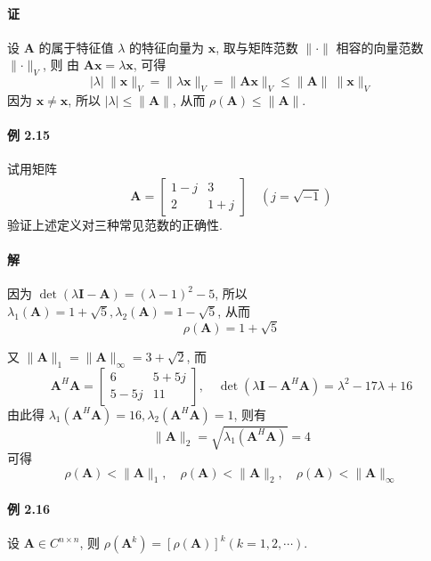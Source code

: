 \paragraph*{证} 设 $\bm{A}$ 的属于特征值 $\lambda$ 的特征向量为 $\bm{x}$, 取与矩阵范数 $\lVert \bm{\cdot} \rVert$ 相容的向量范数 $\lVert \bm{\cdot} \rVert _V$, 则
由 $\bm{Ax} = \lambda\bm{x}$, 可得
$$
    \lvert \lambda \rvert \ \lVert \bm{x} \rVert _V = \lVert \lambda\bm{x} \rVert _V = \lVert \bm{Ax} \rVert _V \leqslant \lVert \bm{A} \rVert \ \lVert \bm{x} \rVert _V
$$
因为 $\bm{x} \neq \bm{x}$, 所以 $\lvert \lambda \rvert \leqslant \lVert \bm{A} \rVert$, 从而 $\rho(\bm{A}) \leqslant \lVert \bm{A} \rVert$.

\paragraph*{例 2.15} 试用矩阵
$$
    \bm{A} = \begin{bmatrix}
        1 - j & 3     \\
        2     & 1 + j
    \end{bmatrix} \quad (j = \sqrt{-1})
$$
验证上述定义对三种常见范数的正确性.

\paragraph*{解} 因为 $\det(\lambda\bm{I} - \bm{A}) = (\lambda - 1)^2 - 5$, 所以 $\lambda_1(\bm{A}) = 1 + \sqrt{5}, \lambda_2(\bm{A}) = 1 -\sqrt{5}$, 从而
$$
    \rho(\bm{A}) = 1 + \sqrt{5}
$$
\par 又 $\lVert \bm{A} \rVert _1 = \lVert \bm{A} \rVert _\infty = 3 + \sqrt{2}$, 而
$$
    \bm{A}^H\bm{A} = \begin{bmatrix}
        6      & 5 + 5j \\
        5 - 5j & 11
    \end{bmatrix}, \quad \det(\lambda\bm{I} - \bm{A}^H\bm{A}) = \lambda^2 - 17\lambda + 16
$$
由此得 $\lambda_1(\bm{A}^H\bm{A}) = 16, \lambda_2(\bm{A}^H\bm{A}) = 1$, 则有
$$
    \lVert \bm{A} \rVert _2 = \sqrt{\lambda_1(\bm{A}^H\bm{A})} = 4
$$
可得
$$
    \rho(\bm{A}) < \lVert \bm{A} \rVert _1, \quad \rho(\bm{A}) < \lVert \bm{A} \rVert _2, \quad \rho(\bm{A}) < \lVert \bm{A} \rVert _\infty
$$

\paragraph*{例 2.16} 设 $\bm{A} \in C^{n\times n}$, 则 $\rho(\bm{A}^k) = [\rho(\bm{A})]^k(k = 1,2,\cdots)$.

